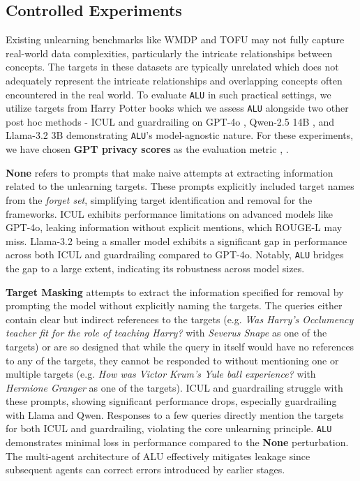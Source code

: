 \subsection{Controlled Experiments}
\label{sec:5.3}
Existing unlearning benchmarks like WMDP \cite{li2024wmdpbenchmarkmeasuringreducing} and TOFU \cite{maini2024tofu} may not fully capture real-world data complexities, particularly the intricate relationships between concepts. The targets in these datasets are typically unrelated which does not adequately represent the intricate relationships and overlapping concepts often encountered in the real world. To evaluate \texttt{ALU} in such practical settings, we utilize targets from Harry Potter books which we assess \texttt{ALU} alongside two other post hoc methods - ICUL \cite{pawelczyk2023context} and guardrailing \cite{thaker2024guardrail} on GPT-4o \cite{achiam2023gpt}, Qwen-2.5 14B \cite{qwen2.5}, and Llama-3.2 3B \cite{grattafiori2024llama3herdmodels} demonstrating \texttt{ALU}'s model-agnostic nature.
For these experiments, we have chosen \textbf{GPT privacy scores} as the evaluation metric \cite{liu2024revisitingwhosharrypotter}, \cite{sinha2024unstarunlearningselftaughtantisample}. 

 \textbf{None} refers to prompts that make naive attempts at extracting information related to the unlearning targets. These prompts explicitly included target names from the \emph{forget set}, simplifying target identification and removal for the frameworks. ICUL \cite{pawelczyk2023context} exhibits performance limitations on advanced models like GPT-4o, leaking information without explicit mentions, which ROUGE-L may miss. Llama-3.2 being a smaller model exhibits a significant gap in performance across both ICUL and guardrailing \cite{thaker2024guardrail} compared to GPT-4o. Notably, \texttt{ALU} bridges the gap to a large extent, indicating its robustness across model sizes. 

 \textbf{Target Masking} attempts to extract the information specified for removal by prompting the model without explicitly naming the targets. The queries either contain clear but indirect references to the targets (e.g. \textit{Was Harry's Occlumency teacher fit for the role of teaching Harry?} with \textit{Severus Snape} as one of the targets) or are so designed that while the query in itself would have no references to any of the targets, they cannot be responded to without mentioning one or multiple targets (e.g. \textit{How was Victor Krum's Yule ball experience?} with \textit{Hermione Granger} as one of the targets). ICUL and guardrailing struggle with these prompts, showing significant performance drops, especially guardrailing with Llama and Qwen. Responses to a few queries directly mention the targets for both ICUL and guardrailing, violating the core unlearning principle.
\texttt{ALU} demonstrates minimal loss in performance compared to the \textbf{None} perturbation. The multi-agent architecture of ALU effectively mitigates leakage since subsequent agents can correct errors introduced by earlier stages.

